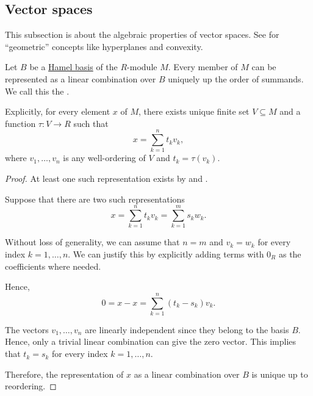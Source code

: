 \subsection{Vector spaces}\label{subsec:vector_spaces}

This subsection is about the algebraic properties of vector spaces. See  for \enquote{geometric} concepts like hyperplanes and convexity.

\begin{proposition}\label{thm:module_basis_decomposition}
  Let \( B \) be a \hyperref[def:semimodule_basis/independent]{Hamel basis} of the \( R \)-module \( M \). Every member of \( M \) can be represented as a linear combination over \( B \) uniquely up the order of summands. We call this the .

  Explicitly, for every element \( x \) of \( M \), there exists unique finite set \( V \subseteq M \) and a function \( \tau: V \to R \) such that
  \begin{equation*}
    x = \sum_{k=1}^n t_k v_k,
  \end{equation*}
  where \( v_1, \ldots, v_n \) is any well-ordering of \( V \) and \( t_k = \tau(v_k) \).
\end{proposition}
\begin{proof}
  At least one such representation exists by  and .

  Suppose that there are two such representations
  \begin{equation*}
    x = \sum_{k=1}^n t_k v_k = \sum_{k=1}^m s_k w_k.
  \end{equation*}

  Without loss of generality, we can assume that \( n = m \) and \( v_k = w_k \) for every index \( k = 1, \ldots, n \). We can justify this by explicitly adding terms with \( 0_R \) as the coefficients where needed.

  Hence,
  \begin{equation*}
    0 = x - x = \sum_{k=1}^n (t_k - s_k) v_k.
  \end{equation*}

  The vectors \( v_1, \ldots, v_n \) are linearly independent since they belong to the basis \( B \). Hence, only a trivial linear combination can give the zero vector. This implies that \( t_k = s_k \) for every index \( k = 1, \ldots, n \).

  Therefore, the representation of \( x \) as a linear combination over \( B \) is unique up to reordering.
\end{proof}

